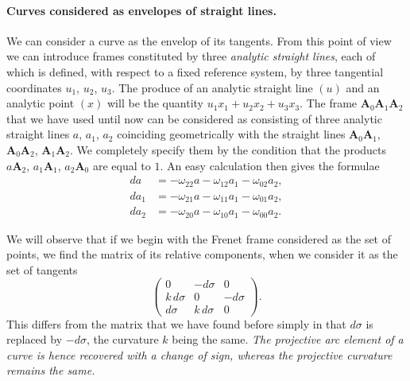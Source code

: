 \documentclass[leqno,11pt]{book}
\numberwithin{equation}{chapter}
\theoremstyle{shape1}
\theoremstyle{shapesmall}
\begin{document}
\paragraph{Curves considered as envelopes of straight lines.}
\label{sec:150}
We can consider a curve as the envelop of its tangents. From this point of view we can introduce frames constituted by three \emph{analytic straight lines}, each of which is defined, with respect to a fixed reference system, by three tangential coordinates $u_{1}$, $u_{2}$, $u_{3}$. The produce of an analytic straight line $(u)$ and an analytic point $(x)$ will be the quantity $u_{1}x_{1}+u_{2}x_{2}+u_{3}x_{3}$. The frame $\mathbf{A}_{0}\mathbf{A}_{1}\mathbf{A}_{2}$ that we have used until now can be considered as consisting of three analytic straight lines $a$, $a_{1}$, $a_{2}$ coinciding geometrically with the straight lines $\mathbf{A}_{0}\mathbf{A}_{1}$, $\mathbf{A}_{0}\mathbf{A}_{2}$, $\mathbf{A}_{1}\mathbf{A}_{2}$. We completely specify them by the condition that the products $a\mathbf{A}_{2}$, $a_{1}\mathbf{A}_{1}$, $a_{2}\mathbf{A}_{0}$ are equal to $1$. An easy calculation then gives the formulae
\begin{align*}
  da_{\phantom{0}}&=-\omega_{22}a-\omega_{12}a_{1}-\omega_{02}a_{2},\\
  da_{{1}}&=-\omega_{21}a-\omega_{11}a_{1}-\omega_{01}a_{2},\\
  da_{{2}}&=-\omega_{20}a-\omega_{10}a_{1}-\omega_{00}a_{2}.
\end{align*}

We will observe that if we begin with the Frenet frame considered as the set of points, we find the matrix of its relative components, when we consider it as the set of tangents
\[
\begin{pmatrix}
  0&-d\sigma&0\\
  k\,d\sigma&0&-d\sigma\\
  d\sigma&k\,d\sigma&0
\end{pmatrix}.
\]
This differs from the matrix that we have found before simply in that $d\sigma$ is replaced by $-d\sigma$, the curvature $k$ being the same. \emph{The projective arc element of a curve is hence recovered with a change of sign, whereas the projective curvature remains the same.}
\end{document}
